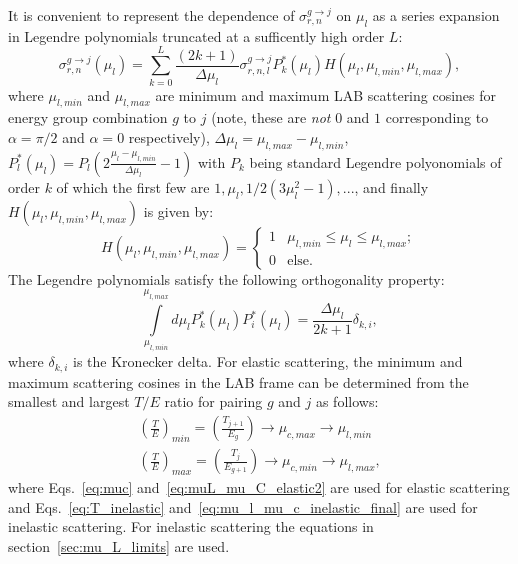 \documentclass[review]{elsarticle}
\begin{document}
It is convenient to represent the dependence of  $\sigma_{r,n}^{g \rightarrow j}$ on $\mu_l$ as a series expansion in Legendre polynomials truncated at a sufficently high order $L$:
\begin{equation}\label{eq:leg_expansion_sigma}
   \sigma_{r,n}^{g \rightarrow j} (\mu_l) = \sum\limits_{k=0}^{L} \frac{(2k +1)}{\Delta \mu_l} \sigma_{r,n,l}^{g \rightarrow j} P_k^*(\mu_l) H(\mu_l, \mu_{l,min}, \mu_{l,max}),
\end{equation}
where $\mu_{l,min}$ and $\mu_{l,max}$ are minimum and maximum LAB scattering cosines for energy group combination $g$ to $j$ (note, these are \textit{not} $0$ and $1$ corresponding to $\alpha=\pi/2$ and $\alpha=0$ respectively), $\Delta \mu_l = \mu_{l,max} - \mu_{l,min}$, $P_l^*(\mu_l)=P_l \left(  2 \frac{\mu_l - \mu_{l,min}}{\Delta \mu_l} - 1  \right)$ with $P_k$ being standard Legendre polyonomials of order $k$ of which the first few are $1, \mu_l, 1/2(3 \mu_l^2 - 1), ...$, and finally $H(\mu_l, \mu_{l,min}, \mu_{l,max})$ is given by:
\begin{equation}
  H(\mu_l, \mu_{l,min}, \mu_{l,max}) = \left\{ \begin{array}{ll}
         1 & \mu_{l,min} \le  \mu_l \le  \mu_{l,max};\\
         0 & \text{else}.\end{array} \right.
\end{equation}
The Legendre polynomials satisfy the following orthogonality property:
\begin{equation}
	\int\limits_{\mu_{l,min}}^{\mu_{l,max}} d \mu_l P^*_k(\mu_l) P^*_{i}(\mu_l) = \frac{\Delta \mu_l}{2k +1} \delta_{k,i},
\end{equation}
where $\delta_{k,i}$ is the Kronecker delta.
For elastic scattering, the minimum and maximum scattering cosines in the LAB frame can be determined from the smallest and largest $T / E$ ratio for pairing $g$ and $j$ as follows:
\begin{align}\label{eq:min_max_mu}
   \left( \frac{T}{E} \right)_{min} = \left( \frac{T_{j+1}}{E_{g}}   \right) \rightarrow \mu_{c,max} \rightarrow \mu_{l,min} \nonumber \\
    \left( \frac{T}{E} \right)_{max} = \left( \frac{T_{j}}{E_{g+1}}   \right) \rightarrow \mu_{c,min} \rightarrow \mu_{l,max},
\end{align}
where Eqs.~\ref{eq:muc} and~\ref{eq:muL_mu_C_elastic2} are used for elastic scattering and Eqs.~\ref{eq:T_inelastic} and~\ref{eq:mu_l_mu_c_inelastic_final} are used for inelastic scattering. For inelastic scattering the equations in section~\ref{sec:mu_L_limits} are used.
\end{document}
